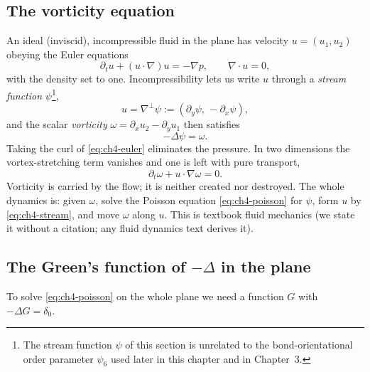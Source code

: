 \subsection{The vorticity equation}
An ideal (inviscid), incompressible fluid in the plane has velocity $u=(u_1,u_2)$ obeying the Euler equations
\begin{equation}\label{eq:ch4-euler}
\partial_t u + (u\cdot\nabla)u = -\nabla p,\qquad \nabla\cdot u = 0 ,
\end{equation}
with the density set to one. Incompressibility lets us write $u$ through a \emph{stream function}
$\psi$\footnote{The stream function $\psi$ of this section is unrelated to the bond-orientational order parameter
$\psi_6$ used later in this chapter and in Chapter~3.},
\begin{equation}\label{eq:ch4-stream}
u = \nabla^{\perp}\psi := (\partial_y\psi,\,-\partial_x\psi),
\end{equation}
and the scalar \emph{vorticity} $\omega = \partial_x u_2 - \partial_y u_1$ then satisfies
\begin{equation}\label{eq:ch4-poisson}
-\Delta\psi = \omega .
\end{equation}
Taking the curl of \eqref{eq:ch4-euler} eliminates the pressure. In two dimensions the vortex-stretching term
vanishes and one is left with pure transport,
\begin{equation}\label{eq:ch4-vorticity}
\partial_t\omega + u\cdot\nabla\omega = 0 .
\end{equation}
Vorticity is carried by the flow; it is neither created nor destroyed. The whole dynamics is: given $\omega$,
solve the Poisson equation \eqref{eq:ch4-poisson} for $\psi$, form $u$ by \eqref{eq:ch4-stream}, and move
$\omega$ along $u$. This is textbook fluid mechanics \tierC{} (we state it without a citation; any fluid
dynamics text derives it).

\subsection{The Green's function of \texorpdfstring{$-\Delta$}{-Laplacian} in the plane}
To solve \eqref{eq:ch4-poisson} on the whole plane we need a function $G$ with $-\Delta G = \delta_0$.

